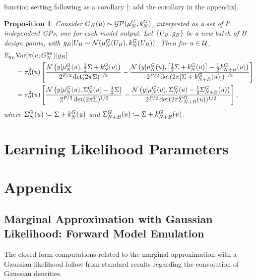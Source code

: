 \documentclass[12pt]{article}
\newtheorem{prop}{Proposition}
\begin{document}
function setting following as a corollary [\todo: add the corollary in the appendix].  
\begin{prop} \label{prop:evar-fwd-emulation}
Consider 
$\fwdEm(\Par) \sim \GP(\emMean[\Ndesign]{\fwd}, \emKer[\Ndesign]{\fwd})$, interpreted as a set of $\dimObs$ independent 
GPs, one for each model output. Let $\{\designBatchIn, \designBatchFwd\}$ be a new batch of $\Nbatch$ 
design points, with
$\designBatchFwd | \designBatchIn \sim \Gaussian(\emMean[\Ndesign]{\fwd}(\designBatchIn), \emKer[\Ndesign]{\fwd}(\designBatchIn))$.
Then for $\Par \in \parSpace$, 
\begin{align}
\E_{\designBatchFwd} &\Var[\postDens(\Par; \fwdEmCond{\designBatchFwd}) | \designBatchFwd] \nonumber \\
&= \priorDens^2(\Par) \left[\frac{\Gaussian\left(\obs | \emMean{\fwd}(\Par), \frac{1}{2}\likPar + \emKer{\fwd}(\Par) \right)}{2^{\dimObs/2} \det(2\pi \likPar)^{1/2}} - 
\frac{\Gaussian\left(\obs | \emMean{\fwd}(\Par), \left[\frac{1}{2}\likPar + \emKer{\fwd}(\Par)\right] - \frac{1}{2}\emKer[\Naugment]{\fwd}(\Par) \right)}{2^{\dimObs/2} \det(2\pi [\likPar + \emKer[\Naugment]{\fwd}(\Par)])^{1/2}} \right] \label{fwd_evar1} \\
&= \priorDens^2(\Par) \left[\frac{\Gaussian\left(\obs | \emMean{\fwd}(\Par), \CovComb(\Par) - \frac{1}{2}\likPar \right)}{2^{\dimObs/2} \det(2\pi \likPar)^{1/2}} - 
\frac{\Gaussian\left(\obs | \emMean{\fwd}(\Par), \CovComb(\Par) - \frac{1}{2}\CovComb[\Naugment](\Par) \right)}{2^{\dimObs/2} \det(2\pi \CovComb[\Naugment](\Par))^{1/2}} \right], \label{fwd_evar2}
\end{align}
where $\CovComb(\Par) \Def \likPar + \emKer{\fwd}(\Par)$ and $\CovComb[\Naugment](\Par) \Def \likPar + \emKer[\Naugment]{\fwd}(\Par)$. 
\end{prop}

\section{Learning Likelihood Parameters} \label{section_lik_par}

% 

\section{Appendix}

\subsection{Marginal Approximation with Gaussian Likelihood: Forward Model Emulation}
The closed-form computations related to the marginal approximation with a Gaussian 
likelihood follow from standard results regarding the convolution of Gaussian densities.  
\end{document}
